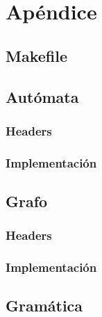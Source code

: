 \section{Apéndice}

\subsection{Makefile}


\bigskip

\subsection{Autómata}

\subsubsection{Headers}

\bigskip

\subsubsection{Implementación}

\bigskip

\subsection{Grafo}

\subsubsection{Headers}

\bigskip

\subsubsection{Implementación}

\bigskip

\subsection{Gramática}


\bigskip
